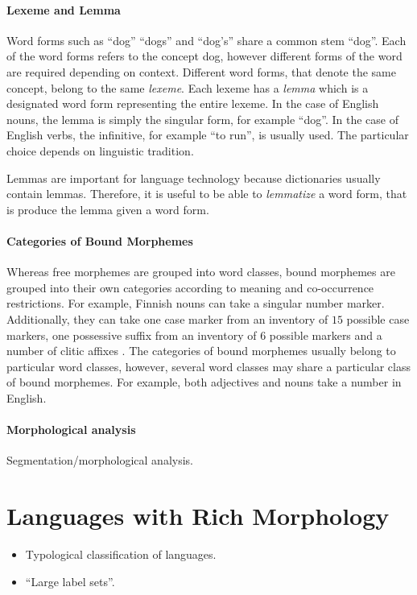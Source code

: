 \paragraph{Lexeme and Lemma} Word forms such as ``dog'' ``dogs'' and
``dog's'' share a common stem ``dog''. Each of the word forms refers
to the concept {\sc dog}, however different forms of the word are
required depending on context. Different word forms, that denote the
same concept, belong to the same {\it lexeme}. Each lexeme has a {\it
  lemma} which is a designated word form representing the entire
lexeme. In the case of English nouns, the lemma is simply the singular
form, for example ``dog''. In the case of English verbs, the
infinitive, for example ``to run'', is usually used. The particular
choice depends on linguistic tradition. 

Lemmas are important for language technology because dictionaries
usually contain lemmas. Therefore, it is useful to be able to {\it
  lemmatize} a word form, that is produce the lemma given a word form.

\paragraph{Categories of Bound Morphemes} Whereas free morphemes are
grouped into word classes, bound morphemes are grouped into their own
categories according to meaning and co-occurrence restrictions. For
example, Finnish nouns can take a singular number
marker. Additionally, they can take one case marker from an inventory
of $15$ possible case markers, one possessive suffix from an inventory
of $6$ possible markers and a number of clitic affixes
\citep{Hakulinen2004}. The categories of bound morphemes usually
belong to particular word classes, however, several word classes may
share a particular class of bound morphemes. For example, both
adjectives and nouns take a number in English.

\paragraph{Morphological analysis} Segmentation/morphological
analysis.

\section{Languages with Rich Morphology}
\begin{itemize}
\item Typological classification of languages.
\item ``Large label sets''.
\end{itemize}

